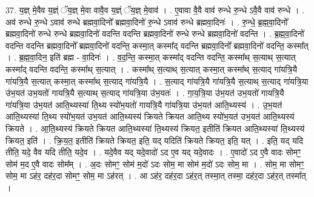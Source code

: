 \documentclass[17pt]{extarticle}
\begin{document}
37. य॒ज्ञ् मे॒वैव य॒ज्ञ्ं ॅय॒ज्ञ् मे॒वा वावै॒व य॒ज्ञ्ं ॅय॒ज्ञ् मे॒वाव॑ । . ए॒वावा वै॒वै वाव॑ रुन्धे रु॒न्धे ऽवै॒वै वाव॑ रुन्धे । . अव॑ रुन्धे रु॒न्धे ऽवाव॑ रुन्धे ब्रह्मवा॒दिनो᳚ ब्रह्मवा॒दिनो॑ रु॒न्धे ऽवाव॑ रुन्धे ब्रह्मवा॒दिनः॑ । . रु॒न्धे॒ ब्र॒ह्म॒वा॒दिनो᳚ ब्रह्मवा॒दिनो॑ रुन्धे रुन्धे ब्रह्मवा॒दिनो॑ वदन्ति वदन्ति ब्रह्मवा॒दिनो॑ रुन्धे रुन्धे ब्रह्मवा॒दिनो॑ वदन्ति । . ब्र॒ह्म॒वा॒दिनो॑ वदन्ति वदन्ति ब्रह्मवा॒दिनो᳚ ब्रह्मवा॒दिनो॑ वदन्ति॒ कस्मा॒त् कस्मा᳚द् वदन्ति ब्रह्मवा॒दिनो᳚ ब्रह्मवा॒दिनो॑ वदन्ति॒ कस्मा᳚त् । . ब्र॒ह्म॒वा॒दिन॒ इति॑ ब्रह्म - वा॒दिनः॑ । . व॒द॒न्ति॒ कस्मा॒त् कस्मा᳚द् वदन्ति वदन्ति॒ कस्मा᳚थ् स॒त्याथ् स॒त्यात् कस्मा᳚द् वदन्ति वदन्ति॒ कस्मा᳚थ् स॒त्यात् । . कस्मा᳚थ् स॒त्याथ् स॒त्यात् कस्मा॒त् कस्मा᳚थ् स॒त्याद् गा॑यत्रि॒यै गा॑यत्रि॒यै स॒त्यात् कस्मा॒त् कस्मा᳚थ् स॒त्याद् गा॑यत्रि॒यै । . स॒त्याद् गा॑यत्रि॒यै गा॑यत्रि॒यै स॒त्याथ् स॒त्याद् गा॑यत्रि॒या उ॑भ॒यत॑ उभ॒यतो॑ गायत्रि॒यै स॒त्याथ् स॒त्याद् गा॑यत्रि॒या उ॑भ॒यतः॑ । . गा॒य॒त्रि॒या उ॑भ॒यत॑ उभ॒यतो॑ गायत्रि॒यै गा॑यत्रि॒या उ॑भ॒यत॑ आति॒थ्यस्या॑ ति॒थ्य स्यो॑भ॒यतो॑ गायत्रि॒यै गा॑यत्रि॒या उ॑भ॒यत॑ आति॒थ्यस्य॑ । . उ॒भ॒यत॑ आति॒थ्यस्या॑ ति॒थ्य स्यो॑भ॒यत॑ उभ॒यत॑ आति॒थ्यस्य॑ क्रियते क्रियत आति॒थ्य स्यो॑भ॒यत॑ उभ॒यत॑ आति॒थ्यस्य॑ क्रियते । . आ॒ति॒थ्यस्य॑ क्रियते क्रियत आति॒थ्यस्या॑ ति॒थ्यस्य॑ क्रियत॒ इतीति॑ क्रियत आति॒थ्यस्या॑ ति॒थ्यस्य॑ क्रियत॒ इति॑ । . क्रि॒य॒त॒ इतीति॑ क्रियते क्रियत॒ इति॒ यद् यदिति॑ क्रियते क्रियत॒ इति॒ यत् । . इति॒ यद् यदि तीति॒ यदे॒ वैव यदि तीति॒ यदे॒व । . यदे॒वैव यद् यदे॒वादो॑ ऽद ए॒व यद् यदे॒वादः । . ए॒वादो॑ ऽद ए॒वै वादः सोमꣳ॒॒ सोम॑ म॒द ए॒वै वादः सोम᳚म् । . अ॒दः सोमꣳ॒॒ सोम॑ म॒दो॑ ऽदः सोम॒ मा सोम॑ म॒दो॑ ऽदः सोम॒ मा । . सोम॒ मा सोमꣳ॒॒ सोम॒ मा ऽह॑र॒ दह॑र॒दा सोमꣳ॒॒ सोम॒ मा ऽह॑रत् । . आ ऽह॑र॒ दह॑र॒दा ऽह॑र॒त् तस्मा॒त् तस्मा॒ दह॑र॒दा ऽह॑र॒त् तस्मा᳚त् । \newline
\pagebreak
{}
\end{document}
